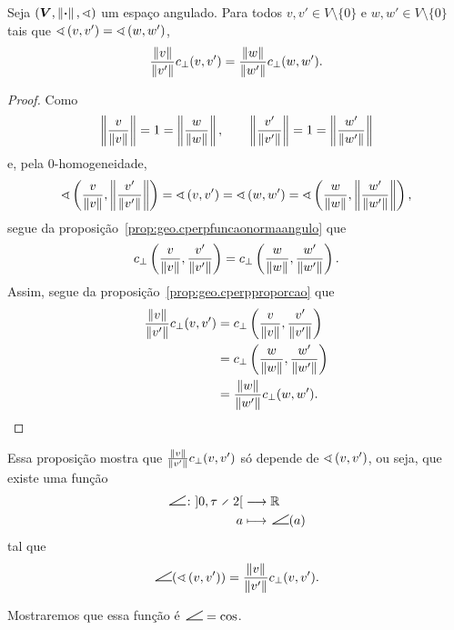 \begin{proposition}
\label{prop:geo.cperpfuncaoangulo}
Seja $(\bm V, \left\Vert{\bm{\cdot}}\right\Vert,\sphericalangle)$ um espaço angulado. Para todos $v,v' \in V \setminus \{0\}$ e $w,w' \in V \setminus \{0\}$ tais que $\sphericalangle\left({v},{v'}\right)=\sphericalangle\left({w},{w'}\right)$,
	\begin{equation*}
	\frac{\left\Vert{v}\right\Vert}{\left\Vert{v'}\right\Vert}c_{\perp}(v,v') = \frac{\left\Vert{w}\right\Vert}{\left\Vert{w'}\right\Vert}c_{\perp}(w,w').
	\end{equation*}
\end{proposition}
\begin{proof}
Como
	\begin{equation*}
	\left\Vert{\frac{v}{\left\Vert{v}\right\Vert}}\right\Vert = 1 = \left\Vert{\frac{w}{\left\Vert{w}\right\Vert}}\right\Vert, \qquad \left\Vert{\frac{v'}{\left\Vert{v'}\right\Vert}}\right\Vert = 1 = \left\Vert{\frac{w'}{\left\Vert{w'}\right\Vert}}\right\Vert
	\end{equation*}
e, pela $0$-homogeneidade,
	\begin{equation*}
	\sphericalangle\left({\frac{v}{\left\Vert{v}\right\Vert}},{\left\Vert{\frac{v'}{\left\Vert{v'}\right\Vert}}\right\Vert}\right) = \sphericalangle\left({v},{v'}\right) = \sphericalangle\left({w},{w'}\right) = \sphericalangle\left({\frac{w}{\left\Vert{w}\right\Vert}},{\left\Vert{\frac{w'}{\left\Vert{w'}\right\Vert}}\right\Vert}\right),
	\end{equation*}
segue da proposição~\ref{prop:geo.cperpfuncaonormaangulo} que
	\begin{equation*}
	c_{\perp}\left( \frac{v}{\left\Vert{v}\right\Vert},\frac{v'}{\left\Vert{v'}\right\Vert} \right) = c_{\perp}\left( \frac{w}{\left\Vert{w}\right\Vert},\frac{w'}{\left\Vert{w'}\right\Vert} \right).
	\end{equation*}
Assim, segue da proposição~\ref{prop:geo.cperpproporcao} que
	\begin{align*}
	\frac{\left\Vert{v}\right\Vert}{\left\Vert{v'}\right\Vert}c_{\perp}(v,v') &= c_{\perp}\left( \frac{v}{\left\Vert{v}\right\Vert},\frac{v'}{\left\Vert{v'}\right\Vert} \right) \\
		&= c_{\perp}\left( \frac{w}{\left\Vert{w}\right\Vert},\frac{w'}{\left\Vert{w'}\right\Vert} \right) \\
		&= \frac{\left\Vert{w}\right\Vert}{\left\Vert{w'}\right\Vert}c_{\perp}(w,w').
	\end{align*}
\end{proof}

Essa proposição mostra que $\frac{\left\Vert{v}\right\Vert}{\left\Vert{v'}\right\Vert}c_{\perp}(v,v')$ só depende de $\sphericalangle\left({v},{v'}\right)$, ou seja, que existe uma função
	\begin{align*}
	\func{\ncos}{\intaa{0}{\tau \div 2}}{\R}{a}{\ncos(a)}
	\end{align*}
tal que
	\begin{equation*}
	\ncos(\ang{v}{v'}) = \frac{\nor{v}}{\nor{v'}}c_{\perp}(v,v').
	\end{equation*}

 Mostraremos que essa função é $\ncos = \cos$.

































